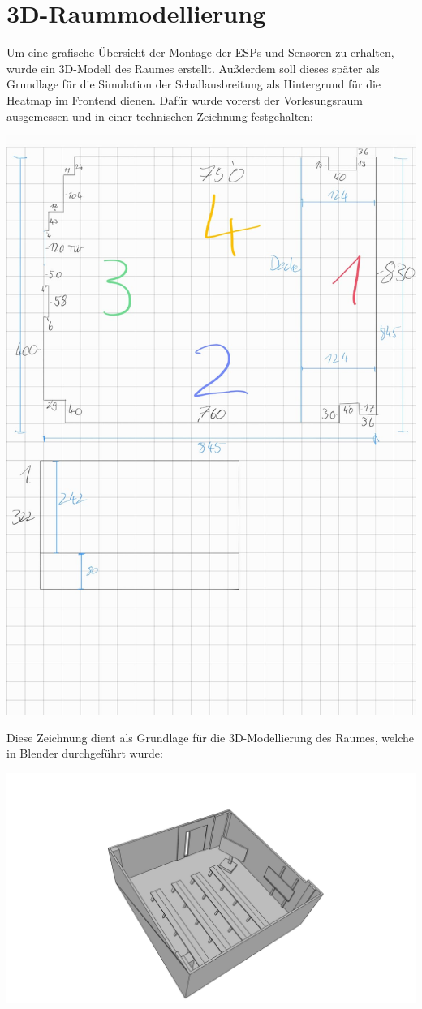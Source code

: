 \section{3D-Raummodellierung}
Um eine grafische Übersicht der Montage der ESPs und Sensoren zu erhalten, wurde ein 3D-Modell des Raumes erstellt.
Außderdem soll dieses später als Grundlage für die Simulation der Schallausbreitung als Hintergrund für die Heatmap im Frontend dienen.
Dafür wurde vorerst der Vorlesungsraum ausgemessen und in einer technischen Zeichnung festgehalten:
\begin{center}
  \includegraphics[width=1\textwidth]{../images/3D-Modell/technZeichnVL.jpeg}
\end{center}
Diese Zeichnung dient als Grundlage für die 3D-Modellierung des Raumes, welche in Blender durchgeführt wurde:
\begin{center}
  \includegraphics[width=1\textwidth]{../images/3D-Modell/VLModell.png}
\end{center}